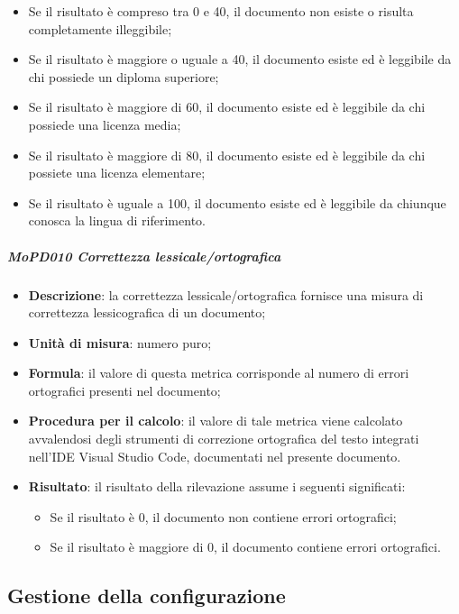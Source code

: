\documentclass[../norme-di-progetto.tex]{subfiles}
\begin{document}
\begin{itemize}
\begin{itemize}
    \item Se il risultato è compreso tra 0 e 40, il documento non esiste o risulta completamente illeggibile;
    \item Se il risultato è maggiore o uguale a 40, il documento esiste ed è leggibile da chi possiede un diploma superiore;
    \item Se il risultato è maggiore di 60, il documento esiste ed è leggibile da chi possiede una licenza media;
    \item Se il risultato è maggiore di 80, il documento esiste ed è leggibile da chi possiete una licenza elementare;
    \item Se il risultato è uguale a 100, il documento esiste ed è leggibile da chiunque conosca la lingua di riferimento.
  \end{itemize}
\end{itemize}

\subparagraph{MoPD010 Correttezza lessicale/ortografica}
\begin{itemize}
  \item \textbf{Descrizione}: la correttezza lessicale/ortografica fornisce una misura di correttezza lessicografica di un documento;
  \item \textbf{Unità di misura}: numero puro;
  \item \textbf{Formula}: il valore di questa metrica corrisponde al numero di errori ortografici presenti nel documento;
  \item \textbf{Procedura per il calcolo}: il valore di tale metrica viene calcolato avvalendosi degli strumenti di correzione ortografica del testo integrati nell'IDE Visual Studio Code, documentati nel presente documento.
  \item \textbf{Risultato}: il risultato della rilevazione assume i seguenti significati:
  \begin{itemize}
    \item Se il risultato è 0, il documento non contiene errori ortografici;
    \item Se il risultato è maggiore di 0, il documento contiene errori ortografici.
  \end{itemize}
\end{itemize}

\subsection{Gestione della configurazione}
\end{document}
